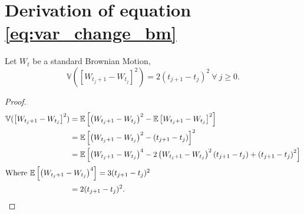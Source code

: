 \documentclass[../TGMAFFIRO]{subfiles}
\begin{document}
  \section{Derivation of equation \ref{eq:var_change_bm}} \label{proof:var_change_bm}
  \begin{proposition}
  Let $W_t$ be a standard Brownian Motion, 
  \begin{equation*}
  	\mathbb{V}(\left[W_{t_j+1} - W_{t_j}\right]^2) = 2\left(t_{j+1} - t_j\right)^2 \ \forall \ j \geq 0.
  \end{equation*}
  
  \begin{proof}
  \begin{align*}
  	\mathbb{V}(\left[W_{t_j+1} - W_{t_j}\right]^2) &= \mathbb{E}\left[\left(W_{t_j+1} - W_{t_j}\right)^2 - \mathbb{E}\left[W_{t_j+1} - W_{t_j}\right]^2\right] \\
  	&= \mathbb{E}\left[\left(W_{t_j+1} - W_{t_j}\right)^2 -\left(t_{j+1} - t_j\right)\right]^2 \\
  	&= \mathbb{E}\left[\left(W_{t_j+1} - W_{t_j}\right)^4  - 2\left(W_{t_j+1} - W_{t_j}\right)^2 \left(t_{j+1} - t_j\right) + \left(t_{j+1} - t_j\right)^2\right] \\
  	\intertext{Where $\mathbb{E}\left[\left(W_{t_j+1} - W_{t_j}\right)^4\right] = 3(t_{j+1} - t_j)^2$}
   	&= 2(t_{j+1} - t_j)^2.
  \end{align*}
  \end{proof}
  \end{proposition}
\end{document}

